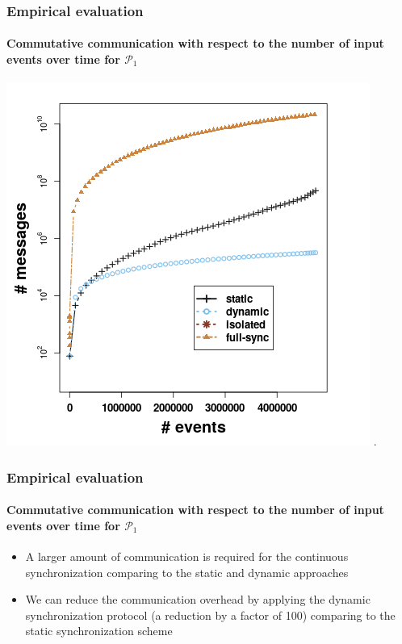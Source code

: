 \begin{frame}
	
	\frametitle{Empirical evaluation }
	\framesubtitle{Commutative communication with respect to the number of input events over time for $\mathcal{P}_1$}
	
	\begin{center}
		\includegraphics[width=.8\textwidth,height=.7\linewidth]{figures/messages_p1.png}
		.
	\end{center}
	
\end{frame}

\begin{frame}
	
	\frametitle{Empirical evaluation }
	\framesubtitle{Commutative communication with respect to the number of input events over time for $\mathcal{P}_1$}
	
	\begin{itemize}
		\item<1-> A larger amount of communication is required for the continuous synchronization comparing to the static and dynamic approaches
		
		\item<1-> We can reduce the communication overhead by applying the dynamic synchronization protocol (a reduction by a factor of 100) comparing to the static synchronization scheme
	
\end{itemize}
\end{frame}




